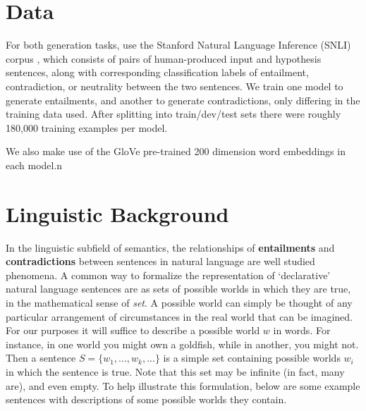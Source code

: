 \documentclass[a4paper, 12pt]{article}
\theoremstyle{definition}
\begin{document}
%

\section{Data}

For both generation tasks, use the Stanford Natural Language Inference (SNLI) corpus \cite{snli-stanford}, which consists of pairs of human-produced input and hypothesis sentences, along with corresponding classification labels of entailment, contradiction, or neutrality between the two sentences. We train one model to generate entailments, and another to generate contradictions, only differing in the training data used. After splitting into train/dev/test sets there were roughly 180,000 training examples per model.

\bigskip

%

We also make use of the GloVe \cite{glove} pre-trained 200 dimension word embeddings in each model.n

\section{Linguistic Background}



In the linguistic subfield of semantics, the relationships of \textbf{entailments} and \textbf{contradictions} between sentences in natural language are well studied phenomena. A common way to formalize the representation of `declarative' natural language sentences are as sets of possible worlds in which they are true, in the mathematical sense of \textit{set}. A possible world can simply be thought of any particular arrangement of circumstances in the real world that can be imagined. For our purposes it will suffice to describe a possible world $w$ in words. For instance, in one world you might own a goldfish, while in another, you might not. Then a sentence $S = \{w_1, ..., w_k, ...\}$ is a simple set containing possible worlds $w_i$ in which the sentence is true. Note that this set may be infinite (in fact, many are), and even empty. To help illustrate this formulation, below are some example sentences with descriptions of some possible worlds they contain.
\end{document}
